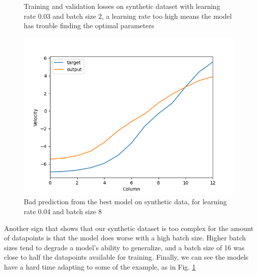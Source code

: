 \documentclass[10pt,conference]{IEEEtran}
\begin{document}
\begin{figure}[h]
\begin{minipage}[h]{0.2\textwidth}
    \caption{Training and validation losses on synthetic dataset with learning rate 0.03 and batch size 2, a learning rate too high means the model has trouble finding the optimal parameters}
    \label{figure:highlr}
  \end{minipage}
  \begin{minipage}[h]{0.2\textwidth}
    \includegraphics[width=\textwidth]{images/result_synth.png}
    \caption{Bad prediction from the best model on synthetic data, for learning rate 0.04 and batch size 8}
    \label{figure:predsynth}
  \end{minipage}
\end{figure}

Another sign that shows that our synthetic dataset is too complex for the amount of datapoints is that the model does worse with a high batch size. Higher batch sizes tend to degrade a model's ability to generalize, and a batch size of 16 was close to half the datapoints available for training. Finally, we can see the models have a hard time adapting to some of the example, as in Fig. \ref{figure:predsynth}
\end{document}
